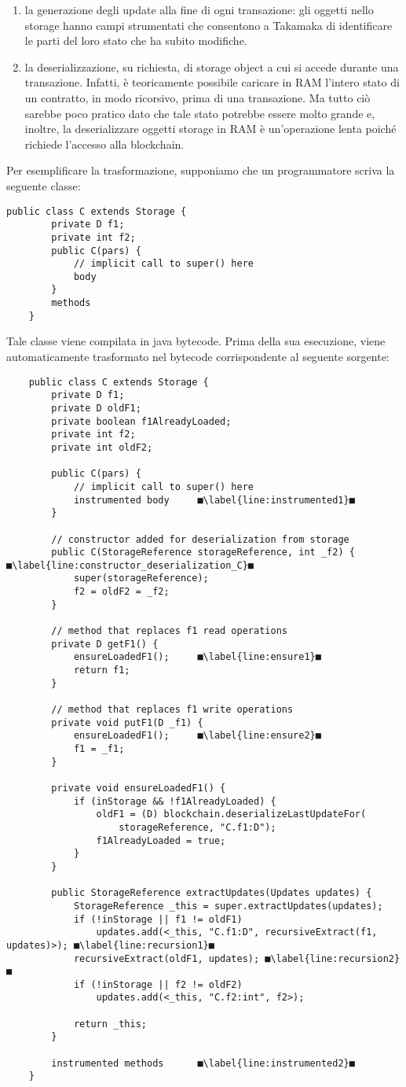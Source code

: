 \begin{enumerate}
	\item la generazione degli update alla fine di ogni transazione: gli oggetti nello storage hanno campi strumentati che consentono a Takamaka di identificare le parti del loro stato che ha subito modifiche.
	\item la deserializzazione, su richiesta, di storage object a cui si accede durante una transazione. Infatti, è teoricamente possibile caricare in RAM l'intero stato di un contratto, in modo ricorsivo, prima di una transazione. Ma tutto ciò sarebbe poco pratico dato che tale stato potrebbe essere molto grande e, inoltre, la deserializzare oggetti storage in RAM è un'operazione lenta poiché richiede l'accesso alla blockchain.
\end{enumerate}
Per esemplificare la trasformazione, supponiamo che un programmatore scriva la seguente classe:
%
\begin{lstlisting}[numbers=none,frame=none]
	public class C extends Storage {
		private D f1;
		private int f2;
		public C(pars) {
			// implicit call to super() here
			body
		}
		methods
	}
\end{lstlisting}
%
Tale classe viene compilata in java bytecode. Prima della sua esecuzione, viene automaticamente trasformato nel bytecode corrispondente al seguente sorgente:
%
\begin{lstlisting}
	public class C extends Storage {
		private D f1;
		private D oldF1;
		private boolean f1AlreadyLoaded;
		private int f2;
		private int oldF2;
	
		public C(pars) {
			// implicit call to super() here
			instrumented body     ■\label{line:instrumented1}■
		}
	
		// constructor added for deserialization from storage
		public C(StorageReference storageReference, int _f2) { ■\label{line:constructor_deserialization_C}■
			super(storageReference);
			f2 = oldF2 = _f2;
		}
		
		// method that replaces f1 read operations
		private D getF1() {
			ensureLoadedF1();     ■\label{line:ensure1}■
			return f1;
		}
		
		// method that replaces f1 write operations
		private void putF1(D _f1) {
			ensureLoadedF1();     ■\label{line:ensure2}■
			f1 = _f1;
		}
		
		private void ensureLoadedF1() {
			if (inStorage && !f1AlreadyLoaded) {
				oldF1 = (D) blockchain.deserializeLastUpdateFor(
					storageReference, "C.f1:D");
				f1AlreadyLoaded = true;
			}
		}
		
		public StorageReference extractUpdates(Updates updates) {
			StorageReference _this = super.extractUpdates(updates);
			if (!inStorage || f1 != oldF1)
				updates.add(<_this, "C.f1:D", recursiveExtract(f1, updates)>); ■\label{line:recursion1}■
			recursiveExtract(oldF1, updates); ■\label{line:recursion2}■
			if (!inStorage || f2 != oldF2)
				updates.add(<_this, "C.f2:int", f2>);
		
			return _this;
		}
		
		instrumented methods      ■\label{line:instrumented2}■
	}
\end{lstlisting}
